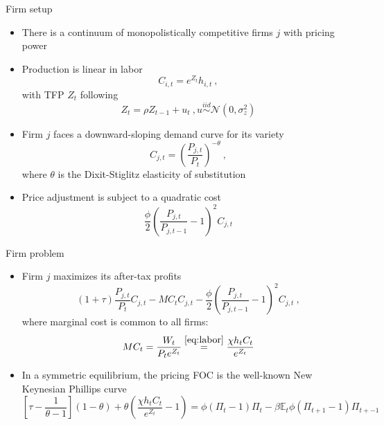 \documentclass[handout,usepdftitle=false,xcolor=dvipsnames,aspectratio=169]{beamer}
\begin{document}
\begin{frame}{Firm setup}
  \begin{itemize}
    \item There is a continuum of monopolistically competitive firms $j$ with pricing power
    \item Production is linear in labor
          \begin{equation}
            C_{i,t}=e^{Z_t}h_{i,t} \: ,
          \end{equation}
          with TFP $Z_t$ following
          \begin{equation}
            Z_t = \rho Z_{t-1} + u_t \: , u \overset{iid}{\sim}\mathcal{N}(0,\sigma_z^2)
          \end{equation}
    \item Firm $j$ faces a downward-sloping demand curve for its variety
          \begin{equation}
            C_{j,t} = \left(\frac{P_{j,t}}{P_t}\right)^{-\theta} \: ,
          \end{equation}
          where $\theta$ is the Dixit-Stiglitz elasticity of substitution
    \item Price adjustment is subject to a \textcite{Rotemberg1982} quadratic cost
          \begin{equation}
            \frac{\phi}{2}\left(\frac{P_{j,t}}{P_{j,t-1}}-1\right)^2 C_{j,t}
          \end{equation}
  \end{itemize}
\end{frame}

\begin{frame}{Firm problem}
  \begin{itemize}
    \item Firm $j$ maximizes its after-tax profits
          \begin{equation}
            (1+\tau)\frac{P_{j,t}}{P_t}C_{j,t}-MC_t C_{j,t}-\frac{\phi}{2}\left(\frac{P_{j,t}}{P_{j,t-1}}-1\right)^2 C_{j,t} \: ,
          \end{equation}
          where marginal cost is common to all firms:
          \begin{equation}
            MC_t = \frac{W_t}{P_t e^{Z_t}} \overset{\eqref{eq:labor}}{=} \frac{\chi h_tC_t}{e^{Z_t}}
          \end{equation}
    \item In a symmetric equilibrium, the pricing FOC is the well-known New Keynesian Phillips curve
          \begin{equation}
            \left[\tau-\frac{1}{\theta-1}\right](1-\theta) +\theta\left(\frac{\chi
              h_t C_t}{e^{Z_t}}-1\right) = \phi(\Pi_t-1)\Pi_t - \beta \mathbb{E}_t\phi(\Pi_{t+1}-1)\Pi_{t+-1}
          \end{equation}
  \end{itemize}
\end{frame}
\end{document}
